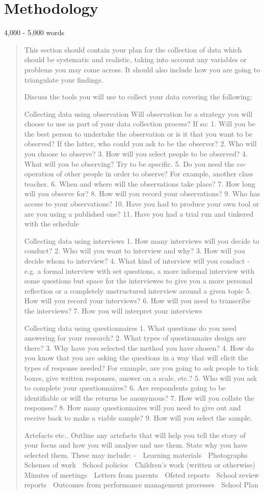 \section{Methodology}
4,000 - 5,000 words
\begin{quote}
This section should contain your plan for the collection of data which should be systematic and realistic, taking into account any variables or problems you may come across. It should also include how you are going to triangulate your findings.

Discuss the tools you will use to collect your data covering the following:

Collecting data using observation
Will observation be a strategy you will choose to use as part of your data collection process?
If so:
1.	Will you be the best person to undertake the observation or is it that you want to be observed?  If the latter, who could you ask to be the observer?
2.	Who will you choose to observe?
3.	How will you select people to be observed?
4.	What will you be observing?  Try to be specific.
5.	Do you need the co-operation of other people in order to observe?  For example, another class teacher.
6.	When and where will the observations take place?
7.	How long will you observe for?
8.	How will you record your observations?
9.	Who has access to your observations?
10.	Have you had to produce your own tool or are you using a published one?
11.	Have you had a trial run and tinkered with the schedule

Collecting data using interviews
1.	How many interviews will you decide to conduct?
2.	Who will you want to interview and why?
3.	How will you decide whom to interview?
4.	What kind of interview will you conduct - e.g. a formal interview with set questions, a more informal interview with some questions but space for the interviewee to give you a more personal reflection or a completely unstructured interview around a given topic
5.	How will you record your interviews?
6.	How will you need to transcribe the interviews?
7.	How you will interpret your interviews
	
Collecting data using questionnaires
1.	What questions do you need answering for your research?
2.	What types of questionnaire design are there?
3.	Why have you selected the method you have chosen?
4.	How do you know that you are asking the questions in a way that will elicit the types of response needed?  For example, are you going to ask people to tick boxes, give written responses, answer on a scale, etc.?
5.	Who will you ask to complete your questionnaires?
6.	Are respondents going to be identifiable or will the returns be anonymous?
7.	How will you collate the responses?
8.	How many questionnaires will you need to give out and receive back to make a viable sample?
9.	How will you select the sample.


Artefacts etc..
Outline any artefacts that will help you tell the story of your focus and how you will analyse and use them. State why you have selected them. These may include: -
	Learning materials
	Photographs
	Schemes of work
	School policies
	Children's work (written or otherwise)
	Minutes of meetings
	Letters from parents
	Ofsted reports
	School review reports
	Outcomes from performance management processes
	School Plan
\end{quote}